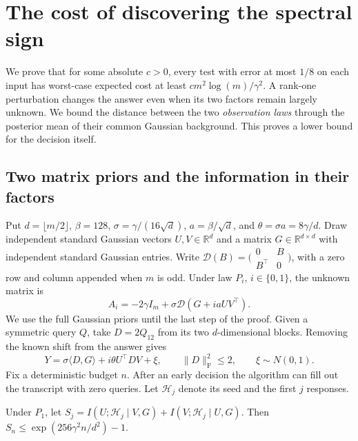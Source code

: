 \section{The cost of discovering the spectral sign}\label{sec:discovery}

We prove that for some absolute \(c>0\), every test with error at most
\(1/8\) on each input has worst-case expected cost at least
\(c m^2\log(m)/\gamma^2\).
A rank-one perturbation changes the answer even when its two factors
remain largely unknown. We bound the distance between the two
\emph{observation laws} through the posterior mean of their common
Gaussian background. This proves a lower bound for the decision itself.

\subsection{Two matrix priors and the information in their factors}

Put \(d=\lfloor m/2\rfloor\), \(\beta=128\),
\(\sigma=\gamma/(16\sqrt d)\), \(a=\beta/\sqrt d\), and
\(\theta=\sigma a=8\gamma/d\). Draw independent standard Gaussian
vectors \(U,V\in\mathbb R^d\) and a matrix \(G\in\mathbb R^{d\times d}\)
with independent standard Gaussian entries. Write
\(\mathcal D(B)=\bigl(\begin{smallmatrix}0&B\\ B^\top&0\end{smallmatrix}\bigr)\),
with a zero row and column appended when \(m\) is odd. Under
law \(P_i\), \(i\in\{0,1\}\), the unknown matrix is
\[
 A_i=-2\gamma I_m+\sigma\mathcal D(G+i a UV^\top).
\]
We use the full Gaussian priors until the last step of the proof.
Given a symmetric query \(Q\), take \(D=2Q_{12}\) from its two
\(d\)-dimensional blocks. Removing the known shift from the answer gives
\begin{equation}\label{eq:disc-observation}
 Y=\sigma\langle D,G\rangle+i\theta U^\top D V+\xi,
 \qquad \|D\|_{\mathrm F}^2\le2,\qquad \xi\sim N(0,1).
\end{equation}
Fix a deterministic budget \(n\). After an early decision the algorithm
can fill out the transcript with zero queries. Let \(\mathcal H_j\)
denote its seed and the first \(j\) responses.

\begin{lemma}\label{lem:disc-information}
Under \(P_1\), let
\(S_j=I(U;\mathcal H_j\mid V,G)+I(V;\mathcal H_j\mid U,G)\).
Then \(S_n\le \exp(256\gamma^2 n/d^2)-1\).
\end{lemma}


